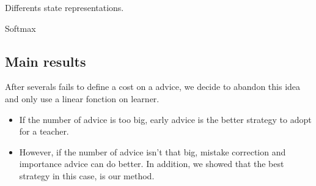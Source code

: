 \documentclass[a4paper,12pt]{article}
\begin{document}
      Differents state representations.
      
      Softmax
      
      \subsection{Main results}
      
      After severals fails to define a cost on a advice, we decide to abandon this idea and only use a 
       linear fonction on learner.
      
      \begin{itemize}
       
      \item If the number of advice is too big, early advice is the better strategy to adopt for a teacher.
      
      \item However, if the number of advice isn't that big, mistake correction and importance advice can
      do better. In addition, we showed that the best strategy in this case, is our method.
      
      \end{itemize}
%        
\end{document}
